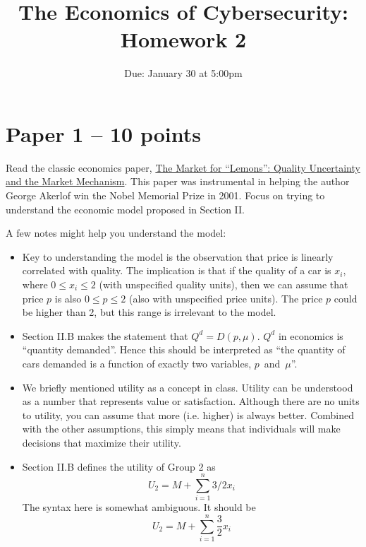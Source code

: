 \documentclass[11pt]{article}
\title{The Economics of Cybersecurity: Homework 2}
\date{Due: January 30 at 5:00pm}
\author{}
\begin{document}
\maketitle

\section{Paper 1 -- 10 points}

Read the classic economics paper, \href{https://www.jstor.org/stable/1879431}{The Market for ``Lemons'': Quality Uncertainty and the Market Mechanism}. 
This paper was instrumental in helping the author George Akerlof win the Nobel Memorial Prize in 2001. 
Focus on trying to understand the economic model proposed in Section II.

A few notes might help you understand the model:
\begin{itemize}
    \item Key to understanding the model is the observation that price is linearly correlated with quality. The implication is that if the quality of a car is $x_i$, where $0\leq x_i \leq 2$ (with unspecified quality units), then we can assume that price $p$ is also $0 \leq p \leq 2$ (also with unspecified price units). The price $p$ could be higher than 2, but this range is irrelevant to the model. 
    \item Section II.B makes the statement that $Q^d = D(p, \mu)$. $Q^d$ in economics is ``quantity demanded''. Hence this should be interpreted as ``the quantity of cars demanded is a function of exactly two variables, $p$~and~$\mu$''.
    \item We briefly mentioned utility as a concept in class. Utility can be understood as a number that represents value or satisfaction. Although there are no units to utility, you can assume that more (i.e. higher) is always better. Combined with the other assumptions, this simply means that individuals will make decisions that maximize their utility.
    \item Section II.B defines the utility of Group 2 as $$U_2 = M + \sum_{i=1}^{n}{3/2x_i}$$ The syntax here is somewhat ambiguous. It should be $$U_2 = M + \sum_{i=1}^{n}{\frac{3}{2}x_i}$$
\end{itemize}
\end{document}
